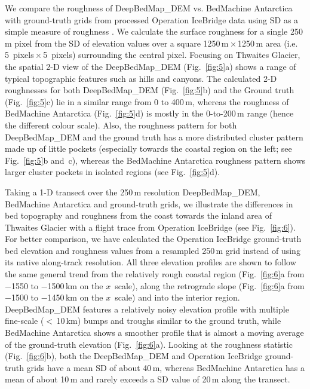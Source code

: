 \documentclass[tc, noline]{copernicus}
\begin{document}
We compare the roughness of DeepBedMap\_DEM vs. BedMachine Antarctica with ground-truth grids from processed Operation IceBridge data
\citep{ShiMultichannelCoherentRadar2010} using SD as a simple measure of roughness \citep{RippinBasalroughnessInstitute2014}. We calculate the surface
roughness for a single 250\,\unit{m} pixel from the SD of elevation values over a square 1250\,\unit{m}\,$\times$\,1250\,\unit{m} area
(i.e. 5~\unit{pixels}\,$\times$\,5~\unit{pixels}) surrounding the central pixel. Focusing on Thwaites Glacier, the spatial 2-D view of the
DeepBedMap\_DEM (Fig.~\ref{fig:5}a) shows a range of typical topographic features such as hills and canyons. The calculated 2-D roughnesses for both
DeepBedMap\_DEM (Fig.~\ref{fig:5}b) and the Ground truth (Fig.~\ref{fig:5}c) lie in a similar range from 0 to 400\,\unit{m}, whereas the roughness of
BedMachine Antarctica (Fig.~\ref{fig:5}d) is mostly in the 0-to-200\,\unit{m} range (hence the different colour scale). Also, the roughness pattern
for both DeepBedMap\_DEM and the ground truth has a more distributed cluster pattern made up of little pockets (especially towards the coastal region
on the left; see Fig.~\ref{fig:5}b and~c), whereas the BedMachine Antarctica roughness pattern shows larger cluster pockets in isolated regions (see
Fig.~\ref{fig:5}d).

Taking a 1-D transect over the 250\,\unit{m} resolution DeepBedMap\_DEM, BedMachine Antarctica and ground-truth grids, we illustrate the differences in
bed topography and roughness from the coast towards the inland area of Thwaites Glacier with a flight trace from Operation IceBridge (see
Fig.~\ref{fig:6}). For better comparison, we have calculated the Operation IceBridge ground-truth bed elevation and roughness values from a resampled
250\,\unit{m} grid instead of using its native along-track resolution. All three elevation profiles are shown to follow the same general trend from
the relatively rough coastal region (Fig.~\ref{fig:6}a from $-$1550 to $-$1500\,\unit{km} on the $x$~scale), along the retrograde slope (Fig.~\ref{fig:6}a
from $-$1500 to $-$1450\,\unit{km} on the $x$~scale) and into the interior region. DeepBedMap\_DEM features a relatively noisy elevation profile with
multiple fine-scale ($<$\,10\,\unit{km}) bumps and troughs similar to the ground truth, while BedMachine Antarctica shows a smoother profile that is
almost a moving average of the ground-truth elevation (Fig.~\ref{fig:6}a). Looking at the roughness statistic (Fig.~\ref{fig:6}b), both the
DeepBedMap\_DEM and Operation IceBridge ground-truth grids have a mean SD of about 40\,\unit{m}, whereas BedMachine Antarctica has a mean of about
10\,\unit{m} and rarely exceeds a SD value of 20\,\unit{m} along the transect.
\end{document}
